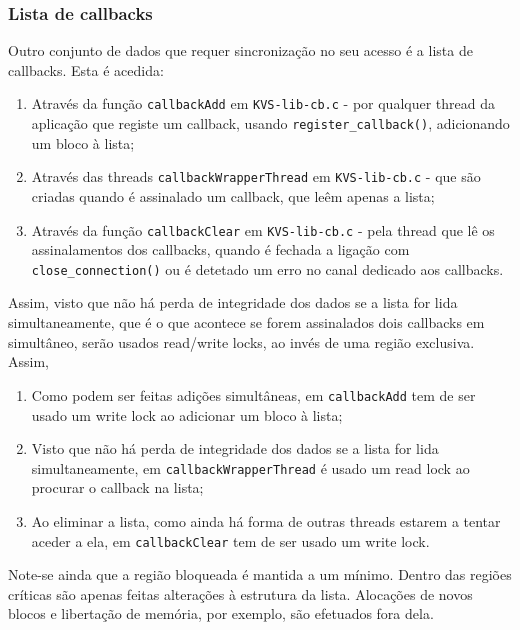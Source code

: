 \subsubsection{Lista de callbacks}
Outro conjunto de dados que requer sincronização no seu acesso é a lista de callbacks. Esta é acedida:
\begin{enumerate}[noitemsep]
    \item Através da função \texttt{callbackAdd} em \texttt{KVS-lib-cb.c} - por qualquer thread da aplicação que registe um callback, usando \texttt{register\_callback()}, adicionando um bloco à lista;
    \item Através das threads \texttt{callbackWrapperThread} em \texttt{KVS-lib-cb.c} - que são criadas quando é assinalado um callback, que leêm apenas a lista;
    \item Através da função \texttt{callbackClear} em \texttt{KVS-lib-cb.c} - pela thread que lê os assinalamentos dos callbacks, quando é fechada a ligação com \texttt{close\_connection()} ou é detetado um erro no canal dedicado aos callbacks.
\end{enumerate}
Assim, visto que não há perda de integridade dos dados se a lista for lida simultaneamente, que é o que acontece se forem assinalados dois callbacks em simultâneo, serão usados read/write locks, ao invés de uma região exclusiva. Assim, 
\begin{enumerate}[noitemsep]
    \item Como podem ser feitas adições simultâneas, em \texttt{callbackAdd} tem de ser usado um write lock ao adicionar um bloco à lista;
    \item Visto que não há perda de integridade dos dados se a lista for lida simultaneamente, em \phantom{jbjkbjbj} \texttt{callbackWrapperThread} é usado um read lock ao procurar o callback na lista;
    \item Ao eliminar a lista, como ainda há forma de outras threads estarem a tentar aceder a ela, em \texttt{callbackClear} tem de ser usado um write lock.
\end{enumerate}

Note-se ainda que a região bloqueada é mantida a um mínimo. Dentro das regiões críticas são apenas feitas alterações à estrutura da lista. Alocações de novos blocos e libertação de memória, por exemplo, são efetuados fora dela.

